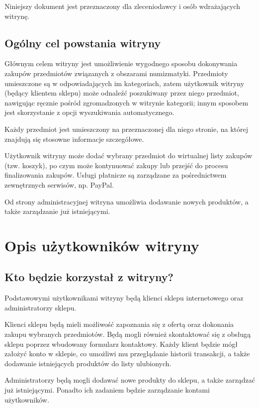 \documentclass [11pt, a4paper, leqno]	{article}	%
\begin{document}
Niniejszy dokument jest przeznaczony dla zleceniodawcy i osób wdrażających witrynę.

\subsection{Ogólny cel powstania witryny}
\noindent
Głównym celem witryny jest umożliwienie wygodnego sposobu dokonywania zakupów przedmiotów związanych z obszarami numizmatyki. Przedmioty umieszczone są w odpowiadających im kategoriach, zatem użytkownik witryny (będący klientem sklepu) może odnaleźć poszukiwany przez niego przedmiot, nawigując ręcznie pośród zgromadzonych w witrynie kategorii; innym sposobem jest skorzystanie z opcji wyszukiwania automatycznego. 

Każdy przedmiot jest umieszczony na przeznaczonej dla niego stronie, na której znajdują się stosowne informacje szczegółowe. 

Użytkownik witryny może dodać wybrany przedmiot do wirtualnej listy zakupów (tzw. koszyk), po czym może kontynuować zakupy lub przejść do procesu finalizowania zakupów. Usługi płatnicze są zarządzane za pośrednictwem zewnętrznych serwisów, np. PayPal. 

Od strony administracyjnej witryna umożliwia dodawanie nowych produktów, a także zarządzanie już istniejącymi.

\section{Opis użytkowników witryny}

\subsection{Kto będzie korzystał z witryny?}
\noindent
Podstawowymi użytkownikami witryny będą klienci sklepu internetowego oraz administratorzy sklepu. 

Klienci sklepu będą mieli możliwość zapoznania się z ofertą oraz dokonania zakupu wybranych przedmiotów. Będą mogli również skontaktować się z obsługą sklepu poprzez wbudowany formularz kontaktowy. Każdy klient będzie mógł założyć konto w sklepie, co umożliwi mu przeglądanie historii transakcji, a także dodawanie istniejących produktów do listy ulubionych.

Administratorzy będą mogli dodawać nowe produkty do sklepu, a także zarządzać już istniejącymi. Ponadto ich zadaniem będzie zarządzanie kontami użytkowników.  
\end{document}
